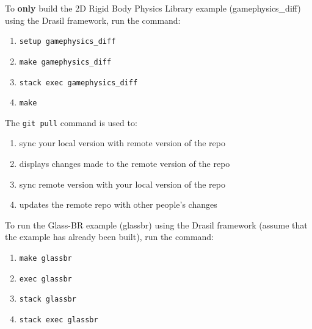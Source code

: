 \documentclass[12pt,fleqn]{examtst}
\begin{document}
\newpage
\noindent
\begin{minipage}{\textwidth}

To \textbf{only} build the 2D Rigid Body Physics Library example (gamephysics\_diff) using the Drasil framework, run the command:

\begin{enumerate}
    \item \lstinline{setup gamephysics_diff}
    \item \lstinline{make gamephysics_diff}
    \item \lstinline{stack exec gamephysics_diff}
    \item \lstinline{make}
\end{enumerate}
\rule{0cm}{1cm}

The \lstinline{git pull} command is used to:

\begin{enumerate}
    \item sync your local version with remote version of the repo
    \item displays changes made to the remote version of the repo
    \item sync remote version with your local version of the repo
    \item updates the remote repo with other people's changes
\end{enumerate}
\rule{0cm}{1cm}

To run the Glass-BR example (glassbr) using the Drasil framework (assume that the example has already been built), run the command:

\begin{enumerate}
    \item \lstinline{make glassbr}
    \item \lstinline{exec glassbr}
    \item \lstinline{stack glassbr}
    \item \lstinline{stack exec glassbr}
\end{enumerate}
\rule{0cm}{1cm}

\end{minipage}

\end{document}
